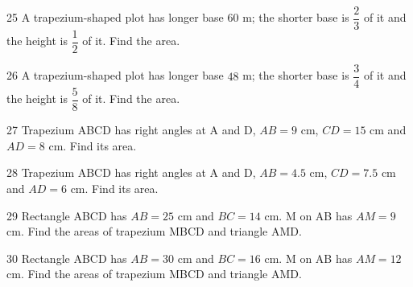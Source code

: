 \gap
\begin{probbox}{25}{\relax}
A trapezium-shaped plot has longer base $60$ m; the shorter base is $\dfrac{2}{3}$ of it and the height is $\dfrac{1}{2}$ of it. Find the area.
\end{probbox}
\gap
\begin{probbox}{26}{\relax}
A trapezium-shaped plot has longer base $48$ m; the shorter base is $\dfrac{3}{4}$ of it and the height is $\dfrac{5}{8}$ of it. Find the area.
\end{probbox}
\gap
\begin{probbox}{27}{\relax}
Trapezium ABCD has right angles at A and D, $AB=9$ cm, $CD=15$ cm and $AD=8$ cm. Find its area.
\end{probbox}
\gap
\begin{probbox}{28}{\relax}
Trapezium ABCD has right angles at A and D, $AB=4.5$ cm, $CD=7.5$ cm and $AD=6$ cm. Find its area.
\end{probbox}
\gap
\begin{probbox}{29}{\relax}
Rectangle ABCD has $AB=25$ cm and $BC=14$ cm. M on AB has $AM=9$ cm. Find the areas of trapezium MBCD and triangle AMD.
\end{probbox}
\gap
\begin{probbox}{30}{\relax}
Rectangle ABCD has $AB=30$ cm and $BC=16$ cm. M on AB has $AM=12$ cm. Find the areas of trapezium MBCD and triangle AMD.
\end{probbox}
